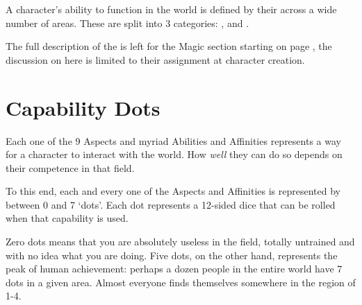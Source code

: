 
\newcommand\abilityRow[3]
{
	\index{Abilities!#3!#1}
	\index{#1|see{Abilities, #3 (#1)}}\imp{#1} & \parbox[t]{6.8 cm}{\raggedright #2} \\
}

\newcommand\abilityTable[1]
{
	{
	\small
	\begin{center}
		\begin{rndtable}{r l}
		\bf Ability	& \bf Description \\
		#1
		\end{rndtable}
	\end{center}
	}
}
\def\cc{\cellcolor{\tablecolorhead}\bf}
\newcommand\fourRow[4]{{\cc \bf \key{#1}}	&	\imp{#2}	&	\imp{#3}	&	\imp{#4} \\}



\label{C:Aspects}

A character's ability to function in the world is defined by their  across a wide number of areas. These  are split into 3 categories: ,  and . 

The full description of the  is left for the Magic section starting on page \pageref{C:Magic}, the discussion on  here is limited to their assignment at character creation. 

\section{Capability Dots}

Each one of the 9 Aspects and myriad Abilities and Affinities represents a way for a character to interact with the world. How {\it well} they can do so depends on their competence in that field. 

To this end, each and every one of the Aspects and Affinities is represented by between 0 and 7 `dots'. Each dot represents a 12-sided dice that can be rolled when that capability is used. 

Zero dots means that you are absolutely useless in the field, totally untrained and with no idea what you are doing. Five dots, on the other hand, represents the peak of human achievement: perhaps a dozen people in the entire world have 7 dots in a given area. Almost everyone finds themselves somewhere in the region of 1-4. 

